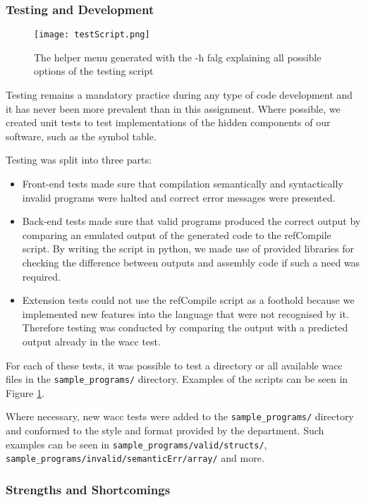 \documentclass[a4paper,12pt]{article}
\newcommand{\shell}[1]{\lstinline!#1!}
\begin{document}
\subsubsection*{Testing and Development}

\begin{figure}
  \texttt{[image: testScript.png]}
  \caption{The helper menu generated with the -h falg explaining all possible options of the testing script}
  \label{fig:testScript}
\end{figure}

Testing remains a mandatory practice during any type of code development and it has never been more prevalent than in this assignment. Where possible, we created unit tests to test implementations of the hidden components of our software, such as the symbol table.

Testing was split into three parts:
\begin{itemize}
    \item Front-end tests made sure that compilation semantically and syntactically invalid programs were halted and correct error messages were presented.
    \item Back-end tests made sure that valid programs produced the correct output by comparing an emulated output of the generated code to the refCompile script. By writing the script in python, we made use of provided libraries for checking the difference between outputs and assembly code if such a need was required.
    \item Extension tests could not use the refCompile script as a foothold because we implemented new features into the language that were not recognised by it. Therefore testing was conducted by comparing the output with a predicted output already in the wacc test.
\end{itemize}

For each of these tests, it was possible to test a directory or all available wacc files in the \shell{sample_programs/} directory. Examples of the scripts can be seen in Figure \ref{fig:testScript}.

Where necessary, new wacc tests were added to the \shell{sample_programs/} directory and conformed to the style and format provided by the department. Such examples can be seen in \shell{sample_programs/valid/structs/}, \shell{sample_programs/invalid/semanticErr/array/} and more.

\subsubsection*{Strengths and Shortcomings}
\end{document}

